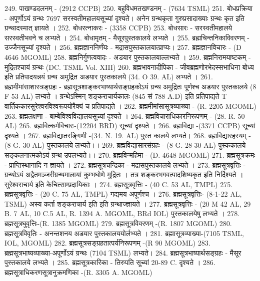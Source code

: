 249. पाखण्डदलनम् - (2912 CCPB)
250. बहुविधमतखण्डनम् - (7634 TSML)
251. बोधप्रक्रिया - अपूर्णोऽयं ग्रन्थः 7697 सरस्वतीमहालयसूच्यां दृश्यते। अनेन ग्रन्थकृता गुरुप्रसादाख्याः ग्रन्थः कृत इति ग्रन्थादस्मात् ज्ञायते । 
252. बोधरत्नाकरः - (3358 CCPB)
253. बोधसारः - सरस्वतीमहालये सरस्वतीभवने च लभ्यते । 
254. बोधामृतम् - मैसूरपुस्तकालये लभ्यते ।
255. ब्रह्मचिन्तनिकाविवरणम् - उज्जैनसूच्यां दृश्यते । 
256. ब्रह्मज्ञाननिर्णंयः - मद्रासपुस्तकालयात्प्राप्यः। 
257. ब्रह्मज्ञानविचारः - (D 4646 MGOML)
258. ब्रह्मनिर्गुणत्ववादः - अडयार पुस्तकालयाल्लभ्यते । 
259. ब्रह्मनिरामयाष्टकम् - मुद्रितश्चायं ग्रन्थः (DC. TSML Vol. XIII)
260. ब्रह्मभावनादीपिका - जीवब्रह्मणोरभेदस्सभाधिना बोध्य इति प्रतिपादयन्नयं ग्रन्थ अमुद्रित अडयार पुस्तकालये (34. O 39. AL) लभ्यते ।
261. ब्रह्ममीमांसाशास्त्रङ्ग्रहः - ब्रह्मसूत्रशाङ्करभाष्यार्थसङ्ग्रहकोऽयं ग्रन्थ अमुद्रितः पूर्णश्च अडयार पुस्तकालये (8 F 53 AL) लभ्यते । ग्रन्थेऽस्मिन् शङ्कराचार्यकालः (845 सं 788 A.D) इति प्रतिपाद्यते T	वार्तिककारसुरेश्वरविश्वरूपयोरैक्यं च प्रतिपाद्यते । 
262. ब्रह्ममीमांसासूत्रव्याख्या - (R. 2205 MGOML)
263. ब्रह्मलक्षणा - बाम्बेविश्वविद्यालयसूच्यां दृश्यते । 
264. ब्रह्मविचाराधिकारनिरूपणम् - (28. R. 50 AL) 
265. ब्रह्मवित्कर्मविचारः-(12204 BRD) सूच्यां दृश्यते । 
266. ब्रह्मविद्या -(3371 CCPB) सूच्यां दृश्यते ।
267. ब्रह्मविद्यातरङ्गिणी -(34. N. 19. AL)	पुस्त कालये लभ्यते।
268. ब्रह्मविद्यारहस्यम् -(8 G. 30 AL) पुस्तकालये लभ्यते।।
269. ब्रह्मविद्यासारसंग्रहः - (8 G. 28-30 AL) पुस्ककालये सङ्कलनात्मकोऽयं ग्रन्थ उपलभ्यते।।
270. ब्रह्मविन्महिमा - (D. 4648 MGOML)
271. ब्रह्मसूत्रक्रमः - प्राप्तिस्थानादि न ज्ञायते । 
272. ब्रह्मसूत्रचन्द्रिका - मद्रासपुस्तकालये लभ्यते ।
273. ब्रह्मसूत्रवृत्तिः - ग्रन्थोऽयं अद्वैतमञ्जरीग्रन्थमालायां कुम्भघोणे मुद्रितः । तत्र शङ्करभगवत्पादशिष्यकृत इति निर्दिश्यते । सुरेश्वराचार्य इति केचित्साम्प्रदायिकाः । 
274. ब्रह्मसूत्रवृत्तिः - (40 C. 53 AL, TMPL)
275. ब्रह्मसूत्रवृत्तिः - (20 C. 75 AL, TMPL) गद्यमय अपूर्णश्च ।
276. ब्रह्मसूत्रवृत्तिः- (8-1-22 AL, TSML) अस्य कर्ता शङ्कराचार्य इति इति ग्रन्थाज्ज्ञायते । 
277. ब्रह्मसूत्रवृत्तिः - (20 M 42 AL, 29 B. 7 AL, 10 C.5 AL, R. 1394 A. MGOML, BRd IOL) पुस्तकालयेषु लभ्यते । 
278. ब्रह्मसूत्रघुवृत्तिः-(R. 1385 MGOML)
279. ब्रह्मसूत्रविवरणम् -(R. 1807 MGOML)
280. ब्रह्मसूत्रविवृतिः - अनन्तशनय अडयार पुस्तकालययोर्लभ्यते ।
281. ब्रह्मासूत्रव्याख्या-(7105 TSML, IOL, MGOML)
282. ब्रह्मसूत्रसङ्ग्रहतात्पर्यनिरूपणम् -(R 90 MGOML)
283. ब्रह्मसूत्रभाष्यव्याख्या-अपूर्णोऽयं ग्रन्थः (7104 TSML) लभ्यते।
284. ब्रह्मसूत्रभाष्यार्थसङ्ग्रहः - मैसूर पुस्तकालये लभ्यते । 
285. ब्रह्मसूत्रकारिका - तिरुपति सूच्यां 20-89 C. दृश्यते । 
286. ब्रह्मसूत्राधिकरणसूत्रानुक्रमणिका -(R. 3305 A. MGOML)
